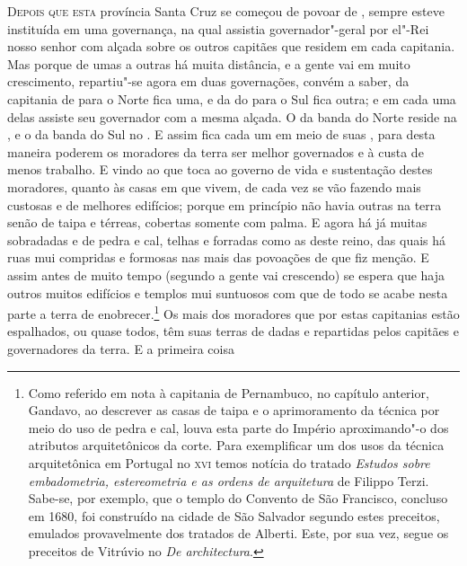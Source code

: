\noindent\textsc{Depois que esta} província Santa Cruz se começou de povoar de    %
, sempre esteve instituída em uma governança, na qual
assistia governador"-geral por el"-Rei nosso senhor com alçada sobre os		  %
outros capitães que residem em cada capitania. Mas  porque de umas a
outras há muita distância, e a gente vai em muito crescimento,
repartiu"-se agora em duas governações, convém a saber, da capitania de
 para o Norte fica uma, e da do  para o Sul
fica outra; e em cada uma delas assiste seu governador com a mesma
alçada. O da banda do Norte reside na , e o da
banda do Sul no . E assim fica cada um em meio de suas
, para desta maneira poderem os moradores da terra ser melhor
governados e à custa de menos trabalho.
E vindo ao que toca ao governo de vida e sustentação destes
moradores, quanto às casas em que vivem, de cada vez se vão fazendo mais
custosas e de melhores edifícios; porque em princípio não havia outras
na terra senão de taipa e térreas, cobertas somente com palma. E agora				%
há já muitas sobradadas e de pedra e cal, telhas e forradas como as				%
deste reino, das quais há ruas mui compridas e formosas nas mais das				%
povoações de que fiz menção. E assim antes de muito tempo (segundo a
gente vai crescendo) se espera que haja outros muitos edifícios e
templos mui suntuosos com que de todo se acabe nesta parte a terra de
enobrecer.\footnote{ Como referido em nota à capitania de Pernambuco, no
capítulo anterior, Gandavo, ao descrever as casas de taipa e o aprimoramento da
técnica por meio do uso de pedra e cal, louva esta parte do Império
aproximando"-o dos atributos arquitetônicos da corte. Para exemplificar um dos
usos da técnica arquitetônica em Portugal no \textsc{xvi} temos notícia do
tratado \textit{Estudos sobre embadometria, estereometria e as ordens de
arquitetura} de Filippo Terzi. Sabe-se, por exemplo, que o templo do Convento
de São Francisco, concluso em 1680, foi construído na cidade de São Salvador
segundo estes preceitos, emulados provavelmente dos tratados de Alberti. Este,
por sua vez, segue os preceitos de Vitrúvio no \textit{De architectura}.}
  Os mais dos moradores que por estas capitanias estão
espalhados, ou quase todos, têm suas terras de  dadas e
repartidas pelos capitães e governadores da terra. E a primeira coisa
